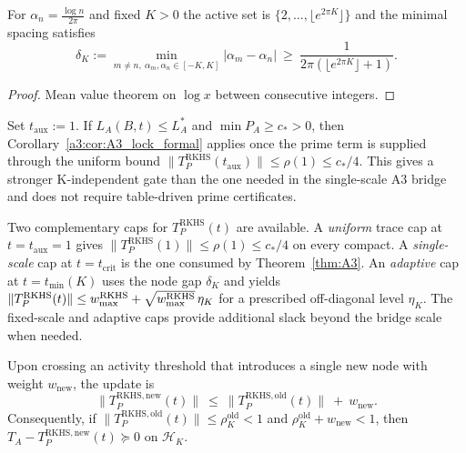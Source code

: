 \begin{lemma}\label{rkhs:lem:node_gap_lower_bound}
For $\alpha_n=\tfrac{\log n}{2\pi}$ and fixed $K>0$ the active set is $\{2,\dots,\lfloor e^{2\pi K}\rfloor\}$ and the minimal spacing satisfies
\begin{equation}\label{eq:RKHS_contraction-formula-2}
\delta_K:=\min_{m\neq n,\ \alpha_m,\alpha_n\in[-K,K]}|\alpha_m-\alpha_n|\ \ge\ \frac{1}{2\pi(\lfloor e^{2\pi K}\rfloor+1)}.
\end{equation}
\end{lemma}

\begin{proof}
Mean value theorem on $\log x$ between consecutive integers.
\end{proof}

\begin{corollary}\label{rkhs:cor:rkhs_two_scale}
Set $t_{\mathrm{aux}}:=1$. If $L_A(B,t)\le L_A^*$ and $\min P_A\ge c_*>0$, then Corollary~\ref{a3:cor:A3_lock_formal}
applies once the prime term is supplied through the uniform bound
$\|T_P^{\mathrm{RKHS}}(t_{\mathrm{aux}})\|\le\rho(1)\le c_*/4$.
This gives a stronger K-independent gate than the one needed in the single-scale A3 bridge and does not require table-driven prime certificates.
\end{corollary}

\begin{remark}\label{rem:prime-caps}
Two complementary caps for $T_P^{\mathrm{RKHS}}(t)$ are available. A \emph{uniform} trace cap at
$t=t_{\mathrm{aux}}=1$ gives $\|T_P^{\mathrm{RKHS}}(1)\|\le \rho(1)\le c_*/4$
on every compact. A \emph{single-scale} cap at $t=t_{\mathrm{crit}}$ is the one consumed by Theorem~\ref{thm:A3}. An \emph{adaptive} cap at $t=t_{\min}(K)$
uses the node gap $\delta_K$ and yields $\|T_P^{\mathrm{RKHS}}(t)\|\le w_{\max}^{\mathrm{RKHS}}+\sqrt{w_{\max}^{\mathrm{RKHS}}}\,\eta_K$
for a prescribed off-diagonal level $\eta_K$. The fixed-scale and adaptive caps provide additional slack beyond the bridge scale when needed.
\end{remark}

\begin{theorem}\label{rkhs:thm:rkhs-ind}
Upon crossing an activity threshold that introduces a single new node with weight $w_{\mathrm{new}}$, the update is
\begin{equation}\label{eq:RKHS_contraction-formula-1}
\|T_P^{\mathrm{RKHS,new}}(t)\|\ \le\ \|T_P^{\mathrm{RKHS,old}}(t)\|\ +\ w_{\mathrm{new}}.
\end{equation}
Consequently, if $\|T_P^{\mathrm{RKHS,old}}(t)\|\le\rho_K^{\mathrm{old}}<1$ and $\rho_K^{\mathrm{old}}+w_{\mathrm{new}}<1$, then $T_A-T_P^{\mathrm{RKHS,new}}(t)\succeq0$ on $\mathcal H_K$.
\end{theorem}

